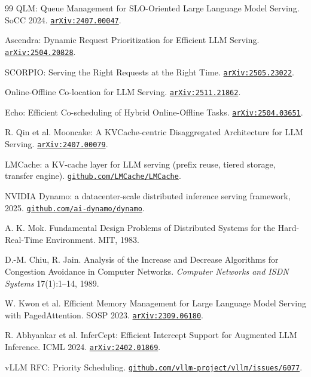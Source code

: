 \documentclass[11pt]{article}
\newcommand{\code}[1]{\texttt{#1}}
\begin{document}
\begin{thebibliography}{99}
 QLM: Queue Management for SLO-Oriented Large Language Model Serving. SoCC
2024. \href{https://arxiv.org/abs/2407.00047}{\code{arXiv:2407.00047}}.

 Ascendra: Dynamic Request Prioritization for Efficient LLM Serving.
\href{https://arxiv.org/abs/2504.20828}{\code{arXiv:2504.20828}}.

 SCORPIO: Serving the Right Requests at the Right Time.
\href{https://arxiv.org/abs/2505.23022}{\code{arXiv:2505.23022}}.

 Online-Offline Co-location for LLM Serving.
\href{https://arxiv.org/abs/2511.21862}{\code{arXiv:2511.21862}}.

 Echo: Efficient Co-scheduling of Hybrid Online-Offline Tasks.
\href{https://arxiv.org/abs/2504.03651}{\code{arXiv:2504.03651}}.

 R. Qin et al. Mooncake: A KVCache-centric Disaggregated Architecture for
LLM Serving. \href{https://arxiv.org/abs/2407.00079}{\code{arXiv:2407.00079}}.

 LMCache: a KV-cache layer for LLM serving (prefix reuse, tiered storage,
transfer engine). \href{https://github.com/LMCache/LMCache}{\code{github.com/LMCache/LMCache}}.

 NVIDIA Dynamo: a datacenter-scale distributed inference serving framework,
2025. \href{https://github.com/ai-dynamo/dynamo}{\code{github.com/ai-dynamo/dynamo}}.

 A. K. Mok. Fundamental Design Problems of Distributed Systems for the Hard-
Real-Time Environment. MIT, 1983.

 D.-M. Chiu, R. Jain. Analysis of the Increase and Decrease Algorithms for
Congestion Avoidance in Computer Networks. \emph{Computer Networks and ISDN Systems}
17(1):1--14, 1989.

 W. Kwon et al. Efficient Memory Management for Large Language Model Serving
with PagedAttention. SOSP 2023.
\href{https://arxiv.org/abs/2309.06180}{\code{arXiv:2309.06180}}.

 R. Abhyankar et al. InferCept: Efficient Intercept Support for Augmented
LLM Inference. ICML 2024. \href{https://arxiv.org/abs/2402.01869}{\code{arXiv:2402.01869}}.

 vLLM RFC: Priority Scheduling.
\href{https://github.com/vllm-project/vllm/issues/6077}{\code{github.com/vllm-project/vllm/issues/6077}}.


\end{thebibliography}
\end{document}

